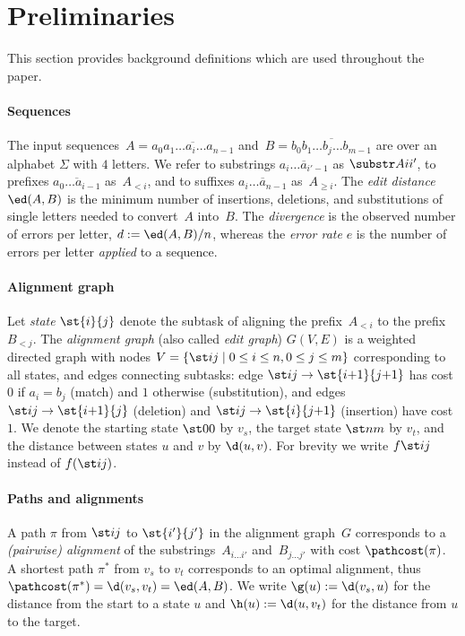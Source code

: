 \section{Preliminaries}\label{sec:preliminaries}

This section provides background definitions which are used throughout the
paper.

\paragraph{Sequences}
The input sequences~$A = \overline{a_0a_1\dots a_i \dots a_{n-1}}$ and~$B =
\overline{b_0b_1 \dots b_j \dots b_{m-1}}$ are over an alphabet $\Sigma$ with
$4$ letters. We refer to substrings $\overline{a_i \dots a_{i'-1}}$ as
$\substr Ai{i'}$, to prefixes $\overline{a_0 \dots a_{i-1}}$ as~$A_{<i}$, and to
suffixes $\overline{a_i \dots a_{n-1}}$ as~$A_{\geq i}$. The \emph{edit
distance} $\ed(A,B)$ is the minimum number of insertions, deletions, and
substitutions of single letters needed to convert~$A$ into~$B$.  The
\emph{divergence} is the observed number of errors per letter, $d:=\ed(A,B)/n$,
whereas the \emph{error rate} $e$ is the number of errors per letter \emph{applied}
to a sequence.

\paragraph{Alignment graph}
Let \emph{state} $\st{i}{j}$ denote the subtask of aligning the prefix~$A_{<i}$
to the prefix~$B_{<j}$. The \emph{alignment graph} (also called \emph{edit
graph}) $G(V,E)$ is a weighted directed graph with nodes $V = \{\st ij \mid
{0\leq i \leq n}, {0\leq j\leq m}\}$ corresponding to all states, and edges
connecting subtasks: edge ${\st ij \to \st{i{+}1}{j{+}1}}$ has cost $0$ if ${a_i
= b_j}$ (match) and $1$ otherwise (substitution), and edges ${\st ij \to
\st{i{+}1}{j}}$ (deletion) and ${\st ij \to\st{i}{j{+}1}}$ (insertion) have cost
$1$. We denote the starting state $\st 00$ by $v_s$, the target state $\st nm$ by
$v_t$, and the distance between states $u$ and $v$ by $\d(u,v)$. For brevity we
write $f \st ij$ instead of $f(\st ij)$.

\paragraph{Paths and alignments}
A path $\pi$ from $\st ij$ to $\st{i'}{j'}$ in the alignment graph~$G$
corresponds to a \emph{(pairwise) alignment} of the substrings~$A_{i \dots i'}$
and~$B_{j \dots j'}$ with cost $\pathcost(\pi)$. A shortest path $\pi^*$ from
$v_s$ to $v_t$ corresponds to an optimal alignment, thus $\pathcost(\pi^*) =
\d(v_s, v_t) = \ed(A, B)$. We write $\g(u) := \d(v_s, u)$ for the distance from
the start to a state $u$ and $\h(u) := \d(u, v_t)$ for the distance from $u$ to
the target.

